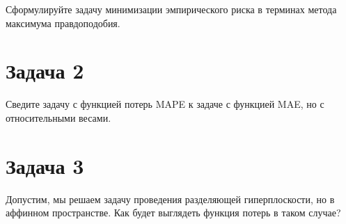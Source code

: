     Сформулируйте задачу минимизации эмпирического риска в терминах метода максимума правдоподобия.

\section*{Задача 2}

    Сведите задачу с функцией потерь MAPE к задаче с функцией MAE, но с относительными весами.


\section*{Задача 3}

    Допустим, мы решаем задачу проведения разделяющей гиперплоскости, но в аффинном пространстве. Как будет выглядеть функция потерь в таком случае?
